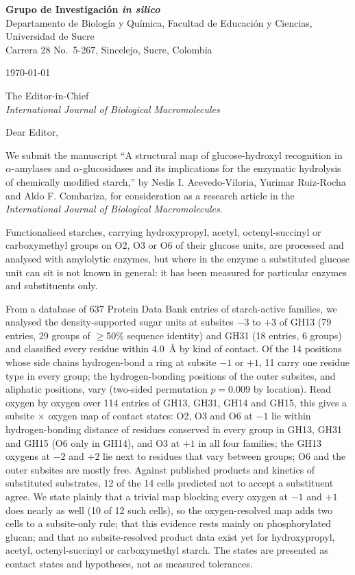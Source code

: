 \documentclass[11pt]{article}
\begin{document}
\begin{flushleft}
\textbf{Grupo de Investigaci\'on \textit{in silico}} \\
Departamento de Biolog\'ia y Qu\'imica, Facultad de Educaci\'{o}n y Ciencias, Universidad de Sucre \\
Carrera 28 No.\ 5-267, Sincelejo, Sucre, Colombia
\end{flushleft}

\today

The Editor-in-Chief \\
\textit{International Journal of Biological Macromolecules}

Dear Editor,

We submit the manuscript ``A structural map of glucose-hydroxyl recognition in $\alpha$-amylases and $\alpha$-glucosidases and its implications for the enzymatic hydrolysis of chemically modified starch,'' by Nedis I. Acevedo-Viloria, Yurimar
Ruiz-Rocha and Aldo F. Combariza, for consideration as a research article in the
\textit{International Journal of Biological Macromolecules}.

Functionalised starches, carrying hydroxypropyl, acetyl, octenyl-succinyl or carboxymethyl groups on O2,
O3 or O6 of their glucose units, are processed and analysed with amylolytic enzymes, but where in the
enzyme a substituted glucose unit can sit is not known in general: it has been measured for particular
enzymes and substituents only.

From a database of 637 Protein Data Bank entries of starch-active families, we analysed the density-supported
sugar units at subsites $-3$ to $+3$ of GH13 (79 entries, 29 groups of $\ge$50\% sequence identity) and GH31 (18
entries, 6 groups) and classified every residue within 4.0~\AA{} by kind of contact. Of the 14 positions whose side
chains hydrogen-bond a ring at subsite $-1$ or $+1$, 11 carry one residue type in every group; the hydrogen-bonding
positions of the outer subsites, and aliphatic positions, vary (two-sided permutation $p = 0.009$ by location).
Read oxygen by oxygen over 114 entries of GH13, GH31, GH14 and GH15, this gives a subsite $\times$ oxygen map of
contact states: O2, O3 and O6 at $-1$ lie within hydrogen-bonding distance of residues conserved in every group in
GH13, GH31 and GH15 (O6 only in GH14), and O3 at $+1$ in all four families; the GH13 oxygens at $-2$ and $+2$ lie next
to residues that vary between groups; O6 and the outer subsites are mostly free. Against published products and
kinetics of substituted substrates, 12 of the 14 cells predicted not to accept a substituent agree. We state plainly
that a trivial map blocking every oxygen at $-1$ and $+1$ does nearly as well (10 of 12 such cells), so the
oxygen-resolved map adds two cells to a subsite-only rule; that this evidence rests mainly on phosphorylated glucan;
and that no subsite-resolved product data exist yet for hydroxypropyl, acetyl, octenyl-succinyl or carboxymethyl
starch. The states are presented as contact states and hypotheses, not as measured tolerances.
\end{document}
